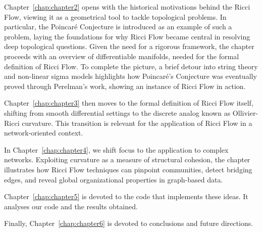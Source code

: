 Chapter~\ref{chap:chapter2} opens with the historical motivations behind the Ricci Flow, viewing it as a geometrical tool to tackle topological problems. In particular, the Poincaré Conjecture is introduced as an example of such a problem, laying the foundations for why Ricci Flow became central in resolving deep topological questions. Given the need for a rigorous framework, the chapter proceeds with an overview of differentiable manifolds, needed for the formal definition of Ricci Flow. To complete the picture, a brief detour into string theory and non-linear sigma models highlights how Poincaré's Conjecture was eventually proved through Perelman's work, showing an instance of Ricci Flow in action.

Chapter~\ref{chap:chapter3} then moves to the formal definition of Ricci Flow itself, shifting from smooth differential settings to the discrete analog known as Ollivier-Ricci curvature. This transition is relevant for the application of Ricci Flow in a network-oriented context.

In Chapter~\ref{chap:chapter4}, we shift focus to the application to complex networks. Exploiting curvature as a measure of structural cohesion, the chapter illustrates how Ricci Flow techniques can pinpoint communities, detect bridging edges, and reveal global organizational properties in graph-based data.

Chapter~\ref{chap:chapter5} is devoted to the code that implements these ideas. It analyses our code and the results obtained.

Finally, Chapter~\ref{chap:chapter6} is devoted to conclusions and future directions.